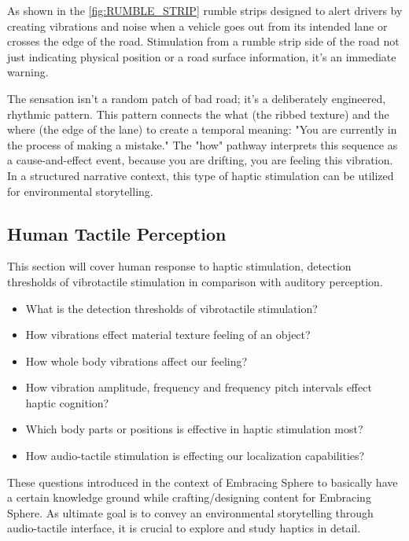             As shown in the \ref{fig:RUMBLE_STRIP} rumble strips designed to alert drivers by creating vibrations and noise when a vehicle goes out from its intended lane or crosses the edge of the road. Stimulation from a rumble strip side of the road not just indicating physical position or a road surface information, it's an immediate warning.\par

            The sensation isn't a random patch of bad road; it's a deliberately engineered, rhythmic pattern. This pattern connects the what (the ribbed texture) and the where (the edge of the lane) to create a temporal meaning: "You are currently in the process of making a mistake." The "how" pathway interprets this sequence as a cause-and-effect event, because you are drifting, you are feeling this vibration. In a structured narrative context, this type of haptic stimulation can be utilized for environmental storytelling.\par
        \subsection{Human Tactile Perception}
            This section will cover human response to haptic stimulation, detection thresholds of vibrotactile stimulation in comparison with auditory perception.\par

            \begin{itemize}
                \item What is the detection thresholds of vibrotactile stimulation?
                \item How vibrations effect material texture feeling of an object?
                \item How whole body vibrations affect our feeling?
                \item How vibration amplitude, frequency and frequency pitch intervals effect haptic cognition?
                \item Which body parts or positions is effective in haptic stimulation most?
                \item How audio-tactile stimulation is effecting our localization capabilities?
            \end{itemize}

            These questions introduced in the context of Embracing Sphere to basically have a certain knowledge ground while crafting/designing content for Embracing Sphere. As ultimate goal is to convey an environmental storytelling through audio-tactile interface, it is crucial to explore and study haptics in detail.\par

